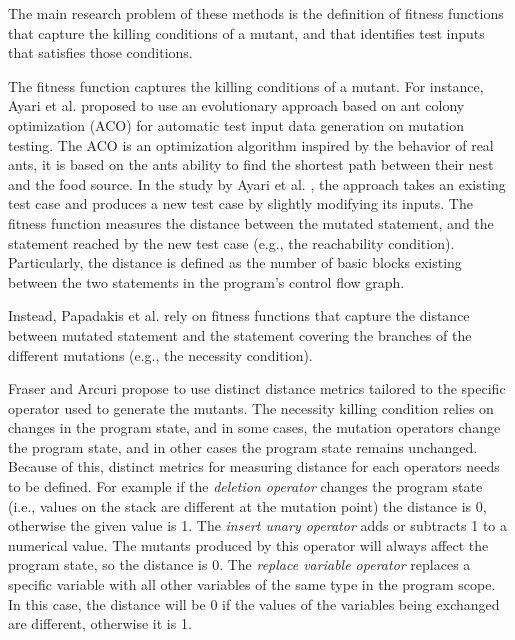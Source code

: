 The main research problem of these methods is the definition of fitness functions that capture the killing conditions of a mutant, and that identifies test inputs that satisfies those conditions.

The fitness function captures the killing conditions of a mutant. For instance, Ayari et al. \cite{ayari2007automatic} proposed to use an evolutionary approach based on ant colony optimization (ACO) for automatic test input data generation on mutation testing. The ACO is an optimization algorithm inspired by the behavior of real ants, it is based on the ants ability to find the shortest path between their nest and the food source. In the study by Ayari et al. \cite{ayari2007automatic}, the approach takes an existing test case and produces a new test case by slightly modifying its inputs. 
The fitness function measures the distance between the mutated statement, and the statement reached by the new test case (e.g., the reachability condition). Particularly, the distance is defined as the number of basic blocks existing between the two statements in the program's control flow graph.

Instead, Papadakis et al. \cite{papadakis2011automatically} rely on fitness functions that capture the distance between mutated statement and the statement covering the branches of the different mutations (e.g., the necessity condition).

Fraser and Arcuri \cite{fraser2015achieving} propose to use distinct distance metrics tailored to the specific operator used to generate the mutants.
The necessity killing condition relies on changes in the program state, and in some cases, the mutation operators change the program state, and in other cases the program state remains unchanged. Because of this, distinct metrics for measuring distance for each operators needs to be defined.
For example if the \textit{deletion operator} changes the program state (i.e., values on the stack are different at the mutation point) the distance is 0, otherwise the given value is 1. 
The \textit{insert unary operator} adds or subtracts 1 to a numerical value. The mutants produced by this operator will always affect the program state, so the distance is 0.
The \textit{replace variable operator} replaces a specific variable with all other variables of the same type in the program scope. In this case, the distance will be 0 if the values of the variables being exchanged are different, otherwise it is 1.

